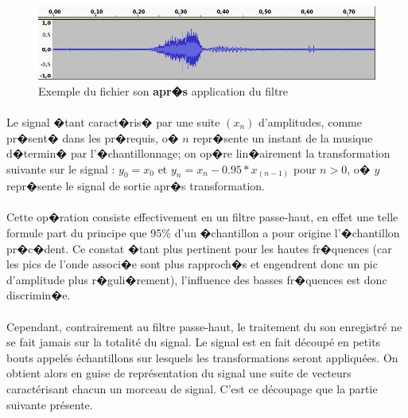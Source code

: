 \begin{figure}[H]
	    \begin{center}
		    \includegraphics[width=15cm]{Images/passehautapres.png} 
	    \end{center}
	    \caption{Exemple du fichier son \textbf{apr�s} application du filtre}
\end{figure}
\paragraph{}
	Le signal �tant caract�ris� par une suite $(x_n)$ 
	d'amplitudes, comme pr�sent� dans les pr�requis, o� $n$ repr�sente un instant de la musique d�termin� par l'�chantillonnage; 
	on op�re lin�airement la transformation suivante sur le signal : $y_0 = x_0$ et $y_n = x_n - 0.95*x_{(n-1)}$  pour $n > 0$, 
	o� $y$ repr�sente le signal de sortie apr�s transformation.
\paragraph{}
	Cette op�ration consiste effectivement en un filtre passe-haut, en effet une telle formule part du principe que 95\% d'un 
	�chantillon a pour origine l'�chantillon pr�c�dent. Ce constat �tant plus pertinent pour les hautes fr�quences (car les 
	pics de l'onde associ�e sont plus rapproch�s et engendrent donc un pic d'amplitude plus r�guli�rement), l'influence des basses fr�quences est donc discrimin�e. 
	
\paragraph{}
	Cependant, contrairement au filtre passe-haut, le traitement du son enregistré ne se fait jamais sur la totalité du signal. Le signal est en fait découpé en
	petits bouts appelés échantillons sur lesquels les transformations seront appliquées. On obtient alors en guise de représentation du signal une suite de vecteurs 
	caractérisant chacun un morceau de signal. C'est ce découpage que la partie suivante présente.
        \newpage
        
